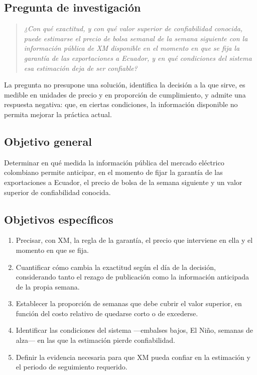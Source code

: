 \documentclass[11pt,letterpaper]{article}
\begin{document}
\subsection{Pregunta de investigación}

\begin{quote}
\itshape
¿Con qué exactitud, y con qué valor superior de confiabilidad conocida,
puede estimarse el precio de bolsa semanal de la semana siguiente con la
información pública de XM disponible en el momento en que se fija la
garantía de las exportaciones a Ecuador, y en qué condiciones del
sistema esa estimación deja de ser confiable?
\end{quote}

La pregunta no presupone una solución, identifica la decisión a la que
sirve, es medible en unidades de precio y en proporción de cumplimiento,
y admite una respuesta negativa: que, en ciertas condiciones, la
información disponible no permita mejorar la práctica actual.

\subsection{Objetivo general}

Determinar en qué medida la información pública del mercado eléctrico
colombiano permite anticipar, en el momento de fijar la garantía de las
exportaciones a Ecuador, el precio de bolsa de la semana siguiente y un
valor superior de confiabilidad conocida.

\subsection{Objetivos específicos}

\begin{enumerate}
  \item Precisar, con XM, la regla de la garantía, el precio que
        interviene en ella y el momento en que se fija.
  \item Cuantificar cómo cambia la exactitud según el día de la
        decisión, considerando tanto el rezago de publicación como la
        información anticipada de la propia semana.
  \item Establecer la proporción de semanas que debe cubrir el valor
        superior, en función del costo relativo de quedarse corto o de
        excederse.
  \item Identificar las condiciones del sistema ---embalses bajos, El
        Niño, semanas de alza--- en las que la estimación pierde
        confiabilidad.
  \item Definir la evidencia necesaria para que XM pueda confiar en la
        estimación y el periodo de seguimiento requerido.
\end{enumerate}
\end{document}
